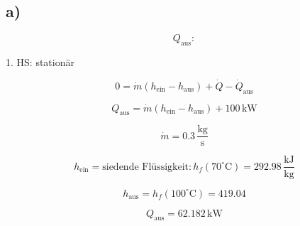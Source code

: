 

\subsection*{a)}

\[
Q_{\text{aus}}:
\]

1. HS: stationär

\[
0 = \dot{m} \left( h_{\text{ein}} - h_{\text{aus}} \right) + \dot{Q} - \dot{Q}_{\text{aus}}
\]

\[
Q_{\text{aus}} = \dot{m} \left( h_{\text{ein}} - h_{\text{aus}} \right) + 100 \, \text{kW}
\]

\[
\dot{m} = 0.3 \, \frac{\text{kg}}{\text{s}}
\]

\[
h_{\text{ein}} = \text{siedende Flüssigkeit:} \, h_f (70^\circ \text{C}) = 292.98 \, \frac{\text{kJ}}{\text{kg}}
\]

\[
h_{\text{aus}} = h_f (100^\circ \text{C}) = 419.04
\]

\[
Q_{\text{aus}} = 62.182 \, \text{kW}
\]